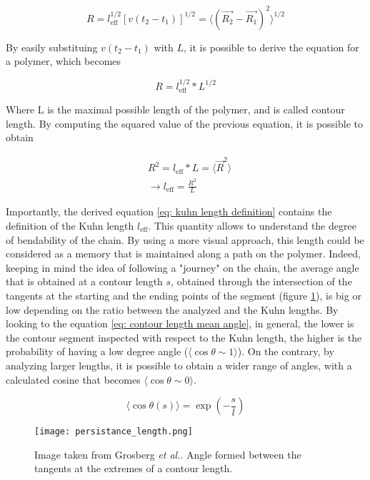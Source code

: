 $$
    R = l_{\text{eff}}^{1/2} [v (t_2 - t_1)]^{1/2} = \langle(\vec{R_2} - \vec{R_1})^2\rangle^{1/2}
$$

By easily substituing $v (t_2 - t_1)$ with $L$, it is possible to derive the equation for a polymer, which becomes

$$
    R = l_{\text{eff}}^{1/2} * L^{1/2}
$$

Where L is the maximal possible length of the polymer, and is called contour length. By computing the squared value of the previous equation, it is possible to obtain

\begin{align} \label{eq: kuhn length definition}
    & R^2 = l_{\text{eff}} * L = \langle\vec{R}^2\rangle \nonumber\\ 
    & \rightarrow l_{\text{eff}} = \frac{R^2}{L} 
\end{align}

Importantly, the derived equation \ref{eq: kuhn length definition} contains the definition of the Kuhn length $l_{\text{eff}}$. This quantity allows to understand the degree of bendability of the chain. By using a more visual approach, this length could be considered as a memory that is maintained along a path on the polymer. Indeed, keeping in mind the idea of following a "journey" on the chain, the average angle that is obtained at a contour length $s$, obtained through the intersection of the tangents at the starting and the ending points of the segment (figure \ref{fig: journey}), is big or low depending on the ratio between the analyzed and the Kuhn lengths. By looking to the equation \ref{eq: contour length mean angle}, in general, the lower is the contour segment inspected with respect to the Kuhn length, the higher is the probability of having a low degree angle ($\langle\cos{\theta} \sim 1\rangle$). On the contrary, by analyzing larger lengths, it is possible to obtain a wider range of angles, with a calculated cosine that becomes $\langle\cos{\theta} \sim 0\rangle$.

\begin{equation} \label{eq: contour length mean angle}
    \langle \cos{\theta(s)}\rangle = \exp{\left(-\frac{s}{l}\right)}
\end{equation}

\begin{figure}[H] 
    \centering 
    \texttt{[image: persistance\_length.png]} 
    \caption{Image taken from Grosberg \textit{et al.}\cite{grosbergGiantMoleculesHere2011}. Angle formed between the tangents at the extremes of a contour length.} 
    \label{fig: journey} 
\end{figure}

